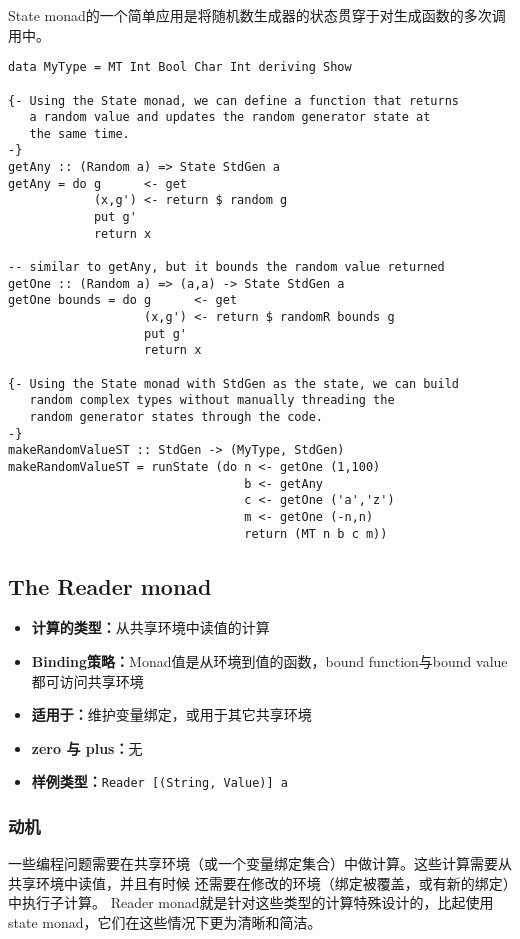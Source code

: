 \indent{}State monad的一个简单应用是将随机数生成器的状态贯穿于对生成函数的多次调用中。
\begin{verbatim}
data MyType = MT Int Bool Char Int deriving Show

{- Using the State monad, we can define a function that returns
   a random value and updates the random generator state at
   the same time.
-}
getAny :: (Random a) => State StdGen a
getAny = do g      <- get
            (x,g') <- return $ random g
            put g'
            return x

-- similar to getAny, but it bounds the random value returned
getOne :: (Random a) => (a,a) -> State StdGen a
getOne bounds = do g      <- get
                   (x,g') <- return $ randomR bounds g
                   put g'
                   return x

{- Using the State monad with StdGen as the state, we can build
   random complex types without manually threading the
   random generator states through the code.
-}
makeRandomValueST :: StdGen -> (MyType, StdGen)
makeRandomValueST = runState (do n <- getOne (1,100)
                                 b <- getAny
                                 c <- getOne ('a','z')
                                 m <- getOne (-n,n)
                                 return (MT n b c m))
\end{verbatim}
\clearpage

\subsection{The Reader monad}
\begin{itemize}[leftmargin=*,topsep=0pt,itemsep=0pt]
\item \textbf{计算的类型：}从共享环境中读值的计算
\item \textbf{Binding策略：}Monad值是从环境到值的函数，bound function与bound value都可访问共享环境
\item \textbf{适用于：}维护变量绑定，或用于其它共享环境
\item \textbf{zero 与 plus：}无
\item \textbf{样例类型：}\texttt{Reader [(String, Value)] a}
\end{itemize}

\subsubsection{动机}
\indent{}一些编程问题需要在共享环境（或一个变量绑定集合）中做计算。这些计算需要从共享环境中读值，并且有时候
还需要在修改的环境（绑定被覆盖，或有新的绑定）中执行子计算。
Reader monad就是针对这些类型的计算特殊设计的，比起使用state monad，它们在这些情况下更为清晰和简洁。

